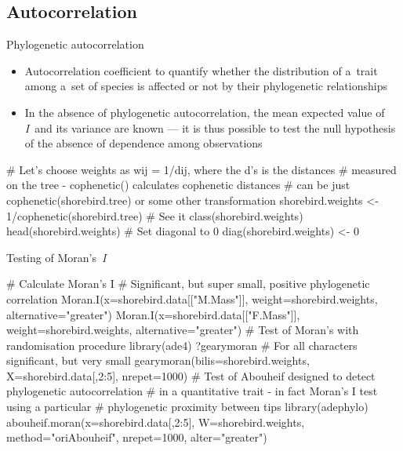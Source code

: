 \documentclass[compress, xelatex, 11pt, xcolor=svgnames, aspectratio=169,
	hyperref={
		bookmarks=true,
		unicode=true,
		colorlinks=true,
		pdftitle={Molecular data in R},
		plainpages=false,
		pdfauthor={Vojtech Zeisek},
		pdfsubject={Course about phylogeny and evolution in R},
		pdfcreator={XeLaTeX},
		pdfkeywords={R, evolution, phylogeny, molecular data},
		linkcolor=Crimson, %
		anchorcolor=Magenta, %
		citecolor=Magenta, %
		filecolor=Magenta, %
		menucolor=Magenta, %
		urlcolor=DodgerBlue, %
		},
	url={hyphens, lowtilde} %
	]{beamer}
\begin{document}
\subsection{Autocorrelation}

\begin{frame}[fragile]{Phylogenetic autocorrelation}
	\begin{itemize}
		\item Autocorrelation coefficient to quantify whether the distribution of a~trait among a~set of species is affected or not by their phylogenetic relationships
		\item In the absence of phylogenetic autocorrelation, the mean expected value of \textit{I}~and its variance are known --- it is thus possible to test the null hypothesis of the absence of dependence among observations
	\end{itemize}
	\begin{spluscode}
    # Let's choose weights as wij = 1/dij, where the d’s is the distances
    # measured on the tree - cophenetic() calculates cophenetic distances
    # can be just cophenetic(shorebird.tree) or some other transformation
    shorebird.weights <- 1/cophenetic(shorebird.tree)
    # See it
    class(shorebird.weights)
    head(shorebird.weights)
    # Set diagonal to 0
    diag(shorebird.weights) <- 0
	\end{spluscode}
\end{frame}

\begin{frame}[fragile]{Testing of Moran's~\textit{I}}
	\begin{spluscode}
    # Calculate Moran's I
    # Significant, but super small, positive phylogenetic correlation
    Moran.I(x=shorebird.data[["M.Mass"]], weight=shorebird.weights,
      alternative="greater")
    Moran.I(x=shorebird.data[["F.Mass"]], weight=shorebird.weights,
      alternative="greater")
    # Test of Moran's with randomisation procedure
    library(ade4)
    ?gearymoran
    # For all characters significant, but very small
    gearymoran(bilis=shorebird.weights, X=shorebird.data[,2:5], nrepet=1000)
    # Test of Abouheif designed to detect phylogenetic autocorrelation
    # in a quantitative trait - in fact Moran's I test using a particular
    # phylogenetic proximity between tips
    library(adephylo)
    abouheif.moran(x=shorebird.data[,2:5], W=shorebird.weights,
      method="oriAbouheif", nrepet=1000, alter="greater")
	\end{spluscode}
\end{frame}
\end{document}
